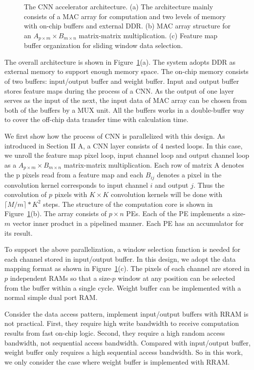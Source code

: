 \begin{figure}[t]
  \vspace{-5pt}
  \caption{The CNN accelerator architecture. (a) The architecture mainly consists of a MAC array for computation and two levels of memory with on-chip buffers and external DDR. (b) MAC array structure for an $A_{p\times m}\times B_{m\times n}$ matrix-matrix multiplication. (c) Feature map buffer organization for sliding window data selection.}
  \vspace{-15pt}
  \label{fig:arch}
\end{figure}

The overall architecture is shown in Figure~\ref{fig:arch}(a). The system adopts DDR as external memory to support enough memory space. The on-chip memory consists of two buffers: input/output buffer and weight buffer. Input and output buffer stores feature maps during the process of a CNN. As the output of one layer serves as the input of the next, the input data of MAC array can be chosen from both of the buffers by a MUX unit. All the buffers works in a double-buffer way to cover the off-chip data transfer time with calculation time.

We first show how the process of CNN is parallelized with this design. As introduced in Section II A, a CNN layer consists of 4 nested loops. In this case, we unroll the feature map pixel loop, input channel loop and output channel loop as a $A_{p\times m}\times B_{m\times n}$ matrix-matrix multiplication. Each row of matrix A denotes the p pixels read from a feature map and each $B_{ij}$ denotes a pixel in the convolution kernel corresponds to input channel $i$ and output $j$. Thus the convolution of $p$ pixels with $K\times K$ convolution kernels will be done with $\lceil M/m\rceil*K^2$ steps. The structure of the computation core is shown in Figure~\ref{fig:arch}(b). The array consists of $p\times n$ PEs. Each of the PE implements a size-$m$ vector inner product in a pipelined manner. Each PE has an accumulator for its result. 

To support the above parallelization, a window selection function is needed for each channel stored in input/output buffer. In this design, we adopt the data mapping format as shown in Figure~\ref{fig:arch}(c). The pixels of each channel are stored in $p$ independent RAMs so that a size-$p$ window at any position can be selected from the buffer within a single cycle. Weight buffer can be implemented with a normal simple dual port RAM.

Consider the data access pattern, implement input/output buffers with RRAM is not practical. First, they require high write bandwidth to receive computation results from fast on-chip logic. Second, they require a high random access bandwidth, not sequential access bandwidth. Compared with input/output buffer, weight buffer only requires a high sequential access bandwidth. So in this work, we only consider the case where weight buffer is implemented with RRAM.


